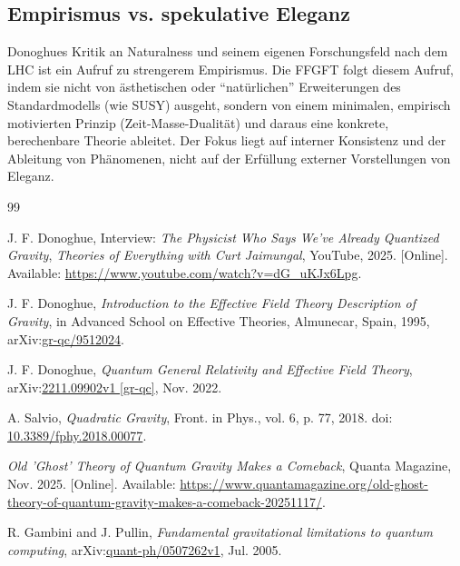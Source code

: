 	\subsection{Empirismus vs. spekulative Eleganz}
	Donoghues Kritik an Naturalness und seinem eigenen Forschungsfeld nach dem LHC ist ein Aufruf zu strengerem Empirismus. Die FFGFT folgt diesem Aufruf, indem sie nicht von ästhetischen oder ``natürlichen'' Erweiterungen des Standardmodells (wie SUSY) ausgeht, sondern von einem minimalen, empirisch motivierten Prinzip (Zeit-Masse-Dualität) und daraus eine konkrete, berechenbare Theorie ableitet. Der Fokus liegt auf interner Konsistenz und der Ableitung von Phänomenen, nicht auf der Erfüllung externer Vorstellungen von Eleganz.
		\begin{thebibliography}{99}
		
		J. F. Donoghue,
		Interview: \emph{The Physicist Who Says We've Already Quantized Gravity},
		\textit{Theories of Everything with Curt Jaimungal}, YouTube, 2025.
		[Online]. Available: \href{https://www.youtube.com/watch?v=dG_uKJx6Lpg}{https://www.youtube.com/watch?v=dG\_uKJx6Lpg}.
		
		J. F. Donoghue,
		\emph{Introduction to the Effective Field Theory Description of Gravity},
		in Advanced School on Effective Theories, Almunecar, Spain, 1995,
		arXiv:\href{https://arxiv.org/abs/gr-qc/9512024}{gr-qc/9512024}.
		
		J. F. Donoghue,
		\emph{Quantum General Relativity and Effective Field Theory},
		arXiv:\href{https://arxiv.org/abs/2211.09902}{2211.09902v1 [gr-qc]}, Nov. 2022.
		
		A. Salvio,
		\emph{Quadratic Gravity},
		Front. in Phys., vol. 6, p. 77, 2018.
		doi: \href{https://doi.org/10.3389/fphy.2018.00077}{10.3389/fphy.2018.00077}.
		
		\emph{Old 'Ghost' Theory of Quantum Gravity Makes a Comeback},
		Quanta Magazine, Nov. 2025.
		[Online]. Available: \href{https://www.quantamagazine.org/old-ghost-theory-of-quantum-gravity-makes-a-comeback-20251117/}{https://www.quantamagazine.org/old-ghost-theory-of-quantum-gravity-makes-a-comeback-20251117/}.
		
		R. Gambini and J. Pullin,
		\emph{Fundamental gravitational limitations to quantum computing},
		arXiv:\href{https://arxiv.org/abs/quant-ph/0507262}{quant-ph/0507262v1}, Jul. 2005.
		

\end{thebibliography}
